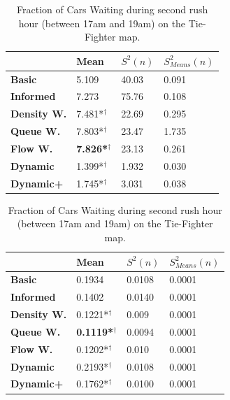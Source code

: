 \documentclass[11pt]{article}
\begin{document}
\begin{table}[h]
\centering
\caption{Average Velocity of Cars during first rush hour (between 17am and 19am) on the Tie-Fighter map.}
\label{my-label}
\begin{tabular}{l|l|l|l|}
\textbf{}                 & \textbf{Mean} & \textbf{$S^2(n)$} & \textbf{$S_{Means}^2(n)$} \\
\hline\textbf{Basic}            & 5.109          & 40.03             & 0.091                      \\
\textbf{Informed}         & 7.273          & 75.76             & 0.108                      \\
\hline\textbf{Density W.} & 7.481*$^\dagger$          & 22.69             & 0.295                      \\
\textbf{Queue W.}   & 7.803*$^\dagger$          & 23.47             & 1.735                      \\
\textbf{Flow W.}    & \textbf{7.826*$^\dagger$} & 23.13             & 0.261                      \\
\textbf{Dynamic}          & 1.399*$^\dagger$          & 1.932             & 0.030                      \\
\textbf{Dynamic+}         & 1.745*$^\dagger$         & 3.031             & 0.038                     
\end{tabular}

\centering
\caption{Fraction of Cars Waiting during second rush hour (between 17am and 19am) on the Tie-Fighter map.}
\label{my-label}
\begin{tabular}{l|l|l|l|}
\textbf{}                 & \textbf{Mean} & \textbf{$S^2(n)$} & \textbf{$S_{Means}^2(n)$} \\
\hline\textbf{Basic}      & 0.1934          & 0.0108            & 0.0001                     \\
\textbf{Informed}   & 0.1402          & 0.0140            & 0.0001                     \\
\hline\textbf{Density W.} & 0.1221*$^\dagger$          & 0.009             & 0.0001                     \\
\textbf{Queue W.}   & \textbf{0.1119*$^\dagger$} & 0.0094            & 0.0001                     \\
\textbf{Flow W.}    & 0.1202*$^\dagger$          & 0.010             & 0.0001                     \\
\textbf{Dynamic}    & 0.2193*$^\dagger$         & 0.0108            & 0.0001                     \\
\textbf{Dynamic+}   & 0.1762*$^\dagger$          & 0.0100            & 0.0001                    
\end{tabular}
\end{table}
\end{document}
